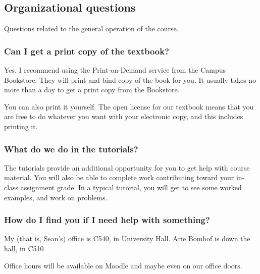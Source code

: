 \documentclass[10pt,]{article}
\begin{document}
\subsection[{Organizational questions}]{Organizational questions}\label{section-general}
\hypertarget{p-3}{}%
Questions related to the general operation of the course.%
%
%
\typeout{************************************************}
\typeout{************************************************}
%
\subsubsection[{Can I get a print copy of the textbook?}]{Can I get a print copy of the textbook?}\label{subsubsection-1}
\hypertarget{p-4}{}%
Yes. I recommend using the Print-on-Demand service from the Campus Bookstore. They will print and bind copy of the book for you. It usually takes no more than a day to get a print copy from the Bookstore.%
\par
\hypertarget{p-5}{}%
You can also print it yourself. The open license for our textbook means that you are free to do whatever you want with your electronic copy, and this includes printing it.%
%
%
\typeout{************************************************}
\typeout{************************************************}
%
\subsubsection[{What do we do in the tutorials?}]{What do we do in the tutorials?}\label{subsubsection-2}
\hypertarget{p-6}{}%
The tutorials provide an additional opportunity for you to get help with course material. You will also be able to complete work contributing toward your in-class assignment grade. In a typical tutorial, you will get to see some worked examples, and work on problems.%
%
%
\typeout{************************************************}
\typeout{************************************************}
%
\subsubsection[{How do I find you if I need help with something?}]{How do I find you if I need help with something?}\label{subsubsection-3}
\hypertarget{p-7}{}%
My (that is, Sean's) office is C540, in University Hall. Arie Bomhof is down the hall, in C510%
\par
\hypertarget{p-8}{}%
Office hours will be available on Moodle and maybe even on our office doors.%
%
%
\typeout{************************************************}
\typeout{************************************************}
%
\end{document}
